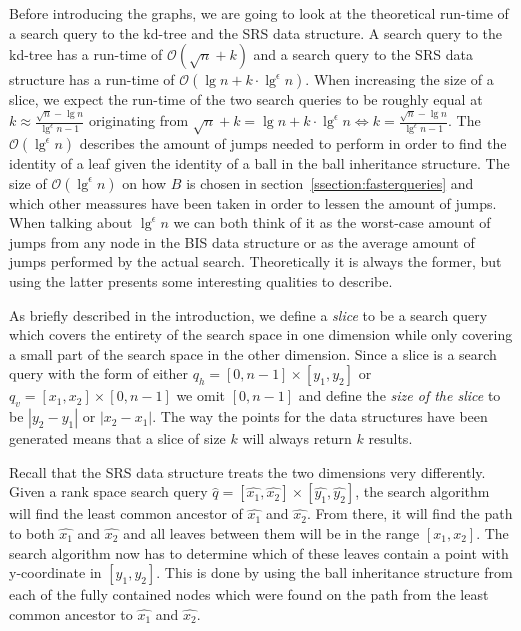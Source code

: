 Before introducing the graphs, we are going to look at the theoretical run-time of a search query to the kd-tree and the SRS data structure. A search query to the kd-tree has a run-time of $\mathcal{O}(\sqrt{n}+k)$ and a search query to the SRS data structure has a run-time of $\mathcal{O}(\lg n + k \cdot \lg^\epsilon n)$. When increasing the size of a slice, we expect the run-time of the two search queries to be roughly equal at $k \approx \frac{\sqrt{n} - \lg n}{\lg^\epsilon n - 1}$ originating from $\sqrt{n} + k = \lg n + k \cdot \lg^\epsilon n \Leftrightarrow k = \frac{\sqrt{n} - \lg n}{\lg^\epsilon n - 1}$. The $\mathcal{O}(\lg^\epsilon n)$ describes the amount of jumps needed to perform in order to find the identity of a leaf given the identity of a ball in the ball inheritance structure. The size of $\mathcal{O}(\lg^\epsilon n)$ on how $B$ is chosen in section~\ref{ssection:fasterqueries} and which other meassures have been taken in order to lessen the amount of jumps. When talking about $\lg^\epsilon n$ we can both think of it as the worst-case amount of jumps from any node in the BIS data structure or as the average amount of jumps performed by the actual search. Theoretically it is always the former, but using the latter presents some interesting qualities to describe.

As briefly described in the introduction, we define a \emph{slice} to be a search query which covers the entirety of the search space in one dimension while only covering a small part of the search space in the other dimension. Since a slice is a search query with the form of either $q_h = [0, n-1] \times [y_1, y_2]$ or $q_v = [x_1, x_2] \times [0, n-1]$ we omit $[0, n-1]$ and define the \emph{size of the slice} to be $\left| y_2-y_1\right|$ or $\left|x_2-x_1\right|$. The way the points for the data structures have been generated means that a slice of size $k$ will always return $k$ results.

Recall that the SRS data structure treats the two dimensions very differently. Given a rank space search query $\hat{q} = [\hat{x_1}, \hat{x_2}] \times [\hat{y_1}, \hat{y_2}]$, the search algorithm will find the least common ancestor of $\hat{x_1}$ and $\hat{x_2}$. From there, it will find the path to both $\hat{x_1}$ and $\hat{x_2}$ and all leaves between them will be in the range $[x_1, x_2]$. The search algorithm now has to determine which of these leaves contain a point with y-coordinate in $[y_1, y_2]$. This is done by using the ball inheritance structure from each of the fully contained nodes which were found on the path from the least common ancestor to $\hat{x_1}$ and $\hat{x_2}$.

